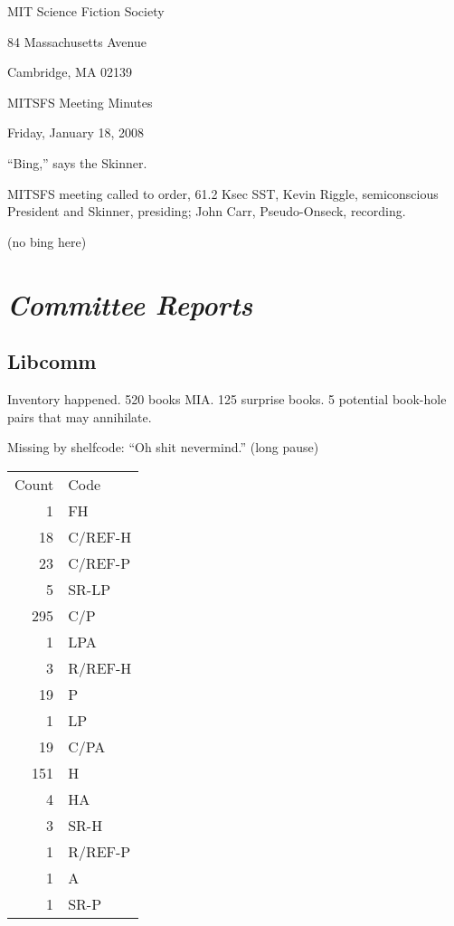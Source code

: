 \documentclass[10pt]{article}
\newcommand{\bing}{{(no bing here)} }
\newcommand{\goto}[1]{\bing \vskip 12pt \section*{{\em{#1}}}}
\begin{document}
\begin{center}

MIT Science Fiction Society

84 Massachusetts Avenue

Cambridge, MA 02139

\vspace{12pt}

MITSFS Meeting Minutes

Friday, January 18, 2008

\end{center}

\vspace{18pt}

\setlength{\parskip}{6pt}

``Bing,'' says the Skinner.

\noindent
MITSFS meeting called to order, 61.2 Ksec SST,
Kevin Riggle, semiconscious President and Skinner, presiding;
John Carr, Pseudo-Onseck, recording.



\goto{Committee Reports}

\subsection*{Libcomm}

Inventory happened.
520 books MIA.
125 surprise books.
5 potential book-hole pairs that may annihilate.

Missing by shelfcode: ``Oh shit nevermind.''  (long pause)

\begin{tabular}{r|l}
Count & Code \\
1  & FH \\
18 & C/REF-H \\
23 & C/REF-P \\
5  & SR-LP \\
295 & C/P \\
   1 & LPA \\
   3 & R/REF-H \\
  19 & P \\
   1 & LP \\
  19 & C/PA \\
 151 & H \\
   4 & HA \\
   3 & SR-H \\
   1 & R/REF-P \\
   1 & A \\
   1 & SR-P \\
\end{tabular}
\end{document}
